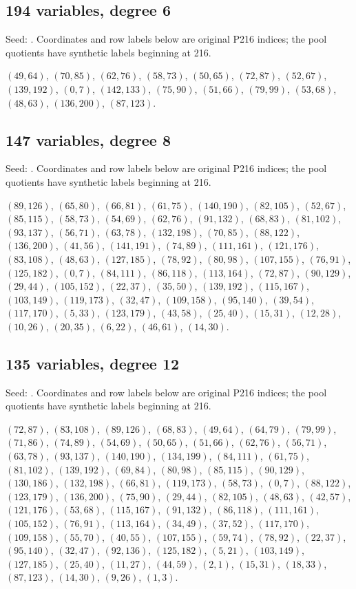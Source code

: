 \subsection*{194 variables, degree 6}
Seed: . Coordinates and row labels below are original P216 indices; the pool quotients have synthetic labels beginning at 216.
{\small\raggedright
$(49,64)$, $(70,85)$, $(62,76)$, $(58,73)$, $(50,65)$, $(72,87)$, $(52,67)$, $(139,192)$, $(0,7)$, $(142,133)$, $(75,90)$, $(51,66)$, $(79,99)$, $(53,68)$, $(48,63)$, $(136,200)$, $(87,123)$.\par}

\subsection*{147 variables, degree 8}
Seed: . Coordinates and row labels below are original P216 indices; the pool quotients have synthetic labels beginning at 216.
{\small\raggedright
$(89,126)$, $(65,80)$, $(66,81)$, $(61,75)$, $(140,190)$, $(82,105)$, $(52,67)$, $(85,115)$, $(58,73)$, $(54,69)$, $(62,76)$, $(91,132)$, $(68,83)$, $(81,102)$, $(93,137)$, $(56,71)$, $(63,78)$, $(132,198)$, $(70,85)$, $(88,122)$, $(136,200)$, $(41,56)$, $(141,191)$, $(74,89)$, $(111,161)$, $(121,176)$, $(83,108)$, $(48,63)$, $(127,185)$, $(78,92)$, $(80,98)$, $(107,155)$, $(76,91)$, $(125,182)$, $(0,7)$, $(84,111)$, $(86,118)$, $(113,164)$, $(72,87)$, $(90,129)$, $(29,44)$, $(105,152)$, $(22,37)$, $(35,50)$, $(139,192)$, $(115,167)$, $(103,149)$, $(119,173)$, $(32,47)$, $(109,158)$, $(95,140)$, $(39,54)$, $(117,170)$, $(5,33)$, $(123,179)$, $(43,58)$, $(25,40)$, $(15,31)$, $(12,28)$, $(10,26)$, $(20,35)$, $(6,22)$, $(46,61)$, $(14,30)$.\par}

\subsection*{135 variables, degree 12}
Seed: . Coordinates and row labels below are original P216 indices; the pool quotients have synthetic labels beginning at 216.
{\small\raggedright
$(72,87)$, $(83,108)$, $(89,126)$, $(68,83)$, $(49,64)$, $(64,79)$, $(79,99)$, $(71,86)$, $(74,89)$, $(54,69)$, $(50,65)$, $(51,66)$, $(62,76)$, $(56,71)$, $(63,78)$, $(93,137)$, $(140,190)$, $(134,199)$, $(84,111)$, $(61,75)$, $(81,102)$, $(139,192)$, $(69,84)$, $(80,98)$, $(85,115)$, $(90,129)$, $(130,186)$, $(132,198)$, $(66,81)$, $(119,173)$, $(58,73)$, $(0,7)$, $(88,122)$, $(123,179)$, $(136,200)$, $(75,90)$, $(29,44)$, $(82,105)$, $(48,63)$, $(42,57)$, $(121,176)$, $(53,68)$, $(115,167)$, $(91,132)$, $(86,118)$, $(111,161)$, $(105,152)$, $(76,91)$, $(113,164)$, $(34,49)$, $(37,52)$, $(117,170)$, $(109,158)$, $(55,70)$, $(40,55)$, $(107,155)$, $(59,74)$, $(78,92)$, $(22,37)$, $(95,140)$, $(32,47)$, $(92,136)$, $(125,182)$, $(5,21)$, $(103,149)$, $(127,185)$, $(25,40)$, $(11,27)$, $(44,59)$, $(2,1)$, $(15,31)$, $(18,33)$, $(87,123)$, $(14,30)$, $(9,26)$, $(1,3)$.\par}

